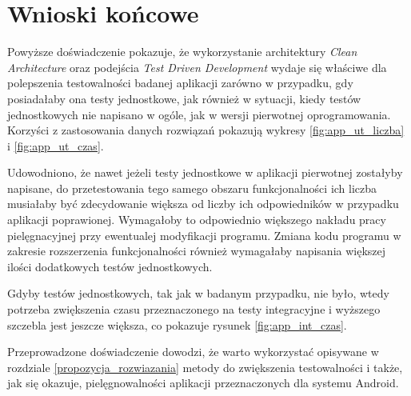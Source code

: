 \section{Wnioski końcowe}
Powyższe doświadczenie pokazuje, że wykorzystanie architektury \textit{Clean Architecture} oraz podejścia \textit{Test Driven Development} wydaje się właściwe dla polepszenia testowalności badanej aplikacji zarówno w przypadku, gdy posiadałaby ona testy jednostkowe, jak również w sytuacji, kiedy testów jednostkowych nie napisano w ogóle, jak w wersji pierwotnej oprogramowania. Korzyści z zastosowania danych rozwiązań pokazują wykresy \ref{fig:app_ut_liczba} i \ref{fig:app_ut_czas}.

Udowodniono, że nawet jeżeli testy jednostkowe w aplikacji pierwotnej zostałyby napisane, do przetestowania tego samego obszaru funkcjonalności ich liczba musiałaby być zdecydowanie większa od liczby ich odpowiedników w przypadku aplikacji poprawionej. Wymagałoby to odpowiednio większego nakładu pracy pielęgnacyjnej przy ewentualej modyfikacji programu. Zmiana kodu programu w zakresie rozszerzenia funkcjonalności również wymagałaby napisania większej ilości dodatkowych testów jednostkowych.

Gdyby testów jednostkowych, tak jak w badanym przypadku, nie było, wtedy potrzeba zwiększenia czasu przeznaczonego na testy integracyjne i wyższego szczebla jest jeszcze większa, co pokazuje rysunek \ref{fig:app_int_czas}.

Przeprowadzone doświadczenie dowodzi, że warto wykorzystać opisywane w rozdziale \ref{propozycja_rozwiazania} metody do zwiększenia testowalności i także, jak się okazuje, pielęgnowalności aplikacji przeznaczonych dla systemu Android. 